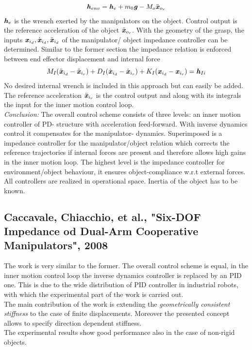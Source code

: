 \documentclass[conference]{IEEEtran}
\begin{document}
\begin{equation}
\textbf{\textit{h}}_{env} = \textbf{\textit{h}}_{e} +m_0\textbf{\textit{g}} - M_o\ddot{\textbf{\textit{x}}}_{o_r}
\end{equation}
$ \textbf{\textit{h}}_e $ is the wrench exerted by the manipulators on the object. Control output is the reference acceleration of the object $ \ddot{\textbf{\textit{x}}}_{o_r} $. With the geometry of the grasp, the inputs $ \textbf{\textit{x}}_{i_d}, \dot{\textbf{\textit{x}}}_{i_d}, \ddot{\textbf{\textit{x}}}_{i_d}  $ of the manipulator/ object impedance controller can be determined. Similar to the former section the impedance relation is enforced between end effector displacement and internal force
\begin{equation}
M_I(\ddot{\textbf{\textit{x}}}_{i_d} - \ddot{\textbf{\textit{x}}}_{i_r})  + D_I(\dot{\textbf{\textit{x}}}_{i_d} - \dot{\textbf{\textit{x}}}_{i_r}) + K_I(\textbf{\textit{x}}_{i_d} - \textbf{\textit{x}}_{i_r})  = \textbf{\textit{h}}_{Ii}
\end{equation}
No desired internal wrench is included in this approach but can easily be added. The reference acceleration $ \ddot{\textbf{\textit{x}}}_{i_r} $ is the control output and along with its integrals the input for the inner motion control loop. \\
\emph{Conclusion: } The overall control scheme consists of three levels: an inner motion controller of PD- structure with acceleration feed-forward. With inverse dynamics control it compensates for the manipulator- dynamics. Superimposed is a impedance controller for the manipulator/object relation which corrects the reference trajectories if internal forces are present and therefore allows high gains in the inner motion loop. The highest level is the impedance controller for environment/object behaviour, it ensures object-compliance w.r.t external forces. All controllers are realized in operational space. Inertia of the object has to be known.


\subsection{Caccavale, Chiacchio, et al., "Six-DOF Impedance od Dual-Arm Cooperative Manipulators", 2008}
The work is very similar to the former. The overall control scheme is equal, in the inner motion control loop the inverse dynamics controller is replaced by an PID one. This is due to the wide distribution of PID controller in industrial robots, with which the experimental part of the work is carried out.\\
The main contribution of the work is extending the \emph{geometrically consistent stiffness} to the case of finite displacements. Moreover the presented concept allows to specify direction dependent stiffness.\\
The experimental results show good performance also in the case of non-rigid objects.
\end{document}
